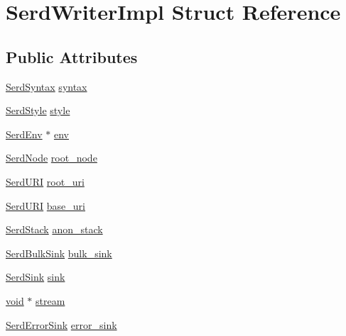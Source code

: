 \hypertarget{struct_serd_writer_impl}{}\section{Serd\+Writer\+Impl Struct Reference}
\label{struct_serd_writer_impl}
\subsection*{Public Attributes}
\begin{DoxyCompactItemize}
\item 
\hyperlink{group__serd_ga42683406fcfa9046b28dd951cefd3391}{Serd\+Syntax} \hyperlink{struct_serd_writer_impl_a7db3f4393ea64d07533d64024757f165}{syntax}
\item 
\hyperlink{group__serd_gae51da58ac1f1886c75ee2326495daeb2}{Serd\+Style} \hyperlink{struct_serd_writer_impl_a731bcb7aa9fdd36e19e9e857b9a75b57}{style}
\item 
\hyperlink{group__serd_gaea4226dd80abea7afa05986f195d4755}{Serd\+Env} $\ast$ \hyperlink{struct_serd_writer_impl_a817b3f152080fae12294fcab0976e3fc}{env}
\item 
\hyperlink{struct_serd_node}{Serd\+Node} \hyperlink{struct_serd_writer_impl_a70e9ffde53e5b1eec566faee8b8db4ab}{root\+\_\+node}
\item 
\hyperlink{struct_serd_u_r_i}{Serd\+U\+RI} \hyperlink{struct_serd_writer_impl_af3ecd74189e4f3f0612802a7c0dd0adb}{root\+\_\+uri}
\item 
\hyperlink{struct_serd_u_r_i}{Serd\+U\+RI} \hyperlink{struct_serd_writer_impl_ae17130ea21f914dedbf71c16dd6059e5}{base\+\_\+uri}
\item 
\hyperlink{struct_serd_stack}{Serd\+Stack} \hyperlink{struct_serd_writer_impl_acf6119b5c84e08398304c8e0101161a9}{anon\+\_\+stack}
\item 
\hyperlink{serd__internal_8h_af4639c5fc5dd66dd251adc714d7d502d}{Serd\+Bulk\+Sink} \hyperlink{struct_serd_writer_impl_a54a2ff42dd04d7d9288b9271aec4f130}{bulk\+\_\+sink}
\item 
\hyperlink{group__serd_ga84861f1df2f4d3323cb0113dae4ced12}{Serd\+Sink} \hyperlink{struct_serd_writer_impl_aac5a4d07e1eb97466d582580ff28ab5d}{sink}
\item 
\hyperlink{sound_8c_ae35f5844602719cf66324f4de2a658b3}{void} $\ast$ \hyperlink{struct_serd_writer_impl_ab62fceebc408a6d4762ef81ef69c958c}{stream}
\item 
\hyperlink{group__serd_ga925d2fda236697a3e643b307ffe242e5}{Serd\+Error\+Sink} \hyperlink{struct_serd_writer_impl_aaa70bfa3692cc1306a44829465b8e3e6}{error\+\_\+sink}

\end{DoxyCompactItemize}
